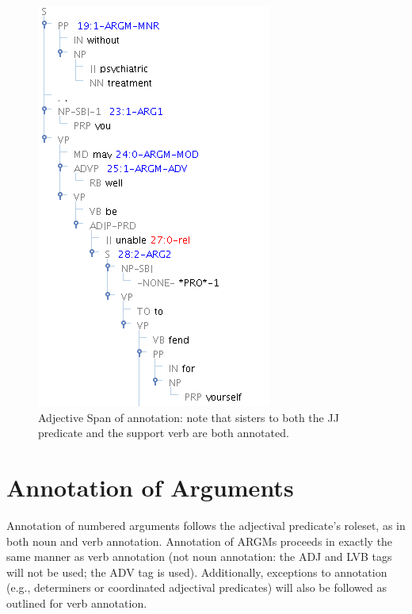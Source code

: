 \documentclass[11pt]{report}
\begin{document}
\begin{figure}[htbp]
\centering
\includegraphics[scale=0.5]{img/AdjSpan.png}
\caption{Adjective Span of annotation: note that sisters to both the JJ predicate and the support verb are both annotated.}
\label{fig: AdjSpan}
\end{figure}

\section{Annotation of Arguments}
Annotation of numbered arguments follows the adjectival predicate's roleset, as in both noun and verb annotation.  Annotation of ARGMs proceeds in exactly the same manner as verb annotation (not noun annotation: the ADJ and LVB tags will not be used; the ADV tag is used).  Additionally, exceptions to annotation (e.g., determiners or coordinated adjectival predicates) will also be followed as outlined for verb annotation.  
\end{document}
